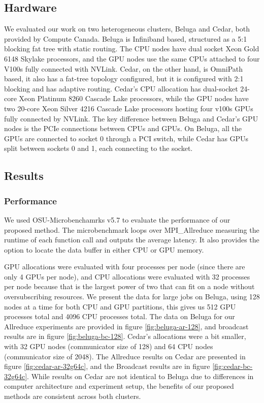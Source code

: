 

\subsection{Hardware}\label{sec:topo-eval-hardware}
We evaluated our work on two heterogeneous clusters, Beluga and Cedar, both provided by Compute Canada. 
Beluga is Infiniband based, structured as a 5:1 blocking fat tree with static routing.  
The CPU nodes have dual socket Xeon Gold 6148 Skylake processors, and the GPU nodes use the same CPUs attached to four V100s fully connected with NVLink.
Cedar, on the other hand, is OmniPath based, it also has a fat-tree topology configured, but it is configured with 2:1 blocking and has adaptive routing.
Cedar's CPU allocation has dual-socket 24-core Xeon Platinum 8260 Cascade Lake processors, while the GPU nodes have two 20-core Xeon Silver 4216 Cascade Lake processors hosting four v100s GPUs fully connected by NVLink.
The key difference between Beluga and Cedar's GPU nodes is the PCIe connections between CPUs and GPUs.
On Beluga, all the GPUs are connected to socket 0 through a PCI switch, while Cedar has GPUs split between sockets 0 and 1, each connecting to the socket.

\subsection{Results}

\subsubsection{Performance}

We used OSU-Microbenchamrks v5.7 \cite{Bureddy2012OMB} to evaluate the performance of our proposed method. 
The microbenchmark loops over MPI\_Allreduce measuring the runtime of each function call and outputs the average latency. 
It also provides the option to locate the data buffer in either CPU or GPU memory.

GPU allocations were evaluated with four processes per node (since there are only 4 GPUs per node), and CPU allocations were evaluated with 32 processes per node because that is the largest power of two that can fit on a node without oversubscribing resources.
We present the data for large jobs on Beluga, using 128 nodes at a time for both CPU and GPU partitions, this gives us 512 GPU processes total and 4096 CPU processes total.
The data on Beluga for our Allreduce experiments are provided in figure \ref{fig:beluga-ar-128}, and broadcast results are in figure \ref{fig:beluga-bc-128}.
Cedar's allocations were a bit smaller, with 32 GPU nodes (communicator size of 128) and 64 CPU nodes (communicator size of 2048).
The Allreduce results on Cedar are presented in figure \ref{fig:cedar-ar-32g64c}, and the Broadcast results are in figure \ref{fig:cedar-bc-32g64c}.
While results on Cedar are not identical to Beluga due to differences in computer architecture and experiment setup, the benefits of our proposed methods are consistent across both clusters.

